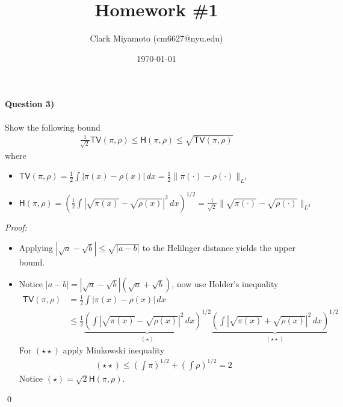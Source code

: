 \documentclass[12pt,fleqn]{article}
\title{Homework \#1}
\author{Clark Miyamoto (cm6627@nyu.edu)}
\date{\today}
\numberwithin{equation}{section}
\theoremstyle{definition}
\theoremstyle{definition}
\begin{document}
\maketitle


\paragraph{Question 3)} 

Show the following bound
\begin{align}
	\frac{1}{\sqrt2 } \textsf{TV}(\pi, \rho) \leq \textsf{H}(\pi, \rho) \leq \sqrt{\textsf{TV}(\pi, \rho)}
\end{align}
where 
\begin{itemize}
	\item $\textsf{TV}(\pi, \rho) = \frac{1}{2} \int |\pi(x) - \rho(x)| \, dx = \frac{1}{2}\|\pi(\cdot) - \rho(\cdot)\|_{L^1}$
	\item $\textsf{H}(\pi, \rho) = \left( \frac{1}{2} \int |\sqrt{\pi(x)} - \sqrt{\rho(x)}|^2 \, dx \right)^{1/2} = \frac{1}{\sqrt{2}} \|\sqrt{\pi(\cdot)} - \sqrt{\rho(\cdot)}\|_{L^2}$
\end{itemize}
\emph{Proof:} 
\begin{itemize}
	\item Applying $|\sqrt{a} - \sqrt{b}| \leq \sqrt{|a-b|}$ to the Helilnger distance yields the upper bound.
	\item Notice $|a - b| = |\sqrt{a} - \sqrt{b} |(\sqrt{a} + \sqrt{b})$, now use Holder's inequality
	\begin{align}
		\textsf{TV}(\pi, \rho) & = \frac{1}{2}\int |\pi(x) - \rho(x)|\, dx\\
		& \leq \frac{1}{2} \underbrace{\left( \int |\sqrt{\pi(x)} - \sqrt{\rho(x)} |^2 \, dx\right)^{1/2}}_{(\star)} \underbrace{\left( \int |\sqrt{\pi(x)} + \sqrt{\rho(x)}|^2 \, dx \right)^{1/2}}_{(\star \star)}
	\end{align}
	For $(\star \star)$ apply Minkowski inequality
	\begin{align}
		(\star \star) \leq \left(\int \pi \right)^{1/2} + \left(\int \rho \right)^{1/2} = 2
	\end{align}
	Notice $(\star) = \sqrt 2 \textsf{H}(\pi, \rho)$. 
\end{itemize}
\qed




\newpage
\appendix
\end{document}
